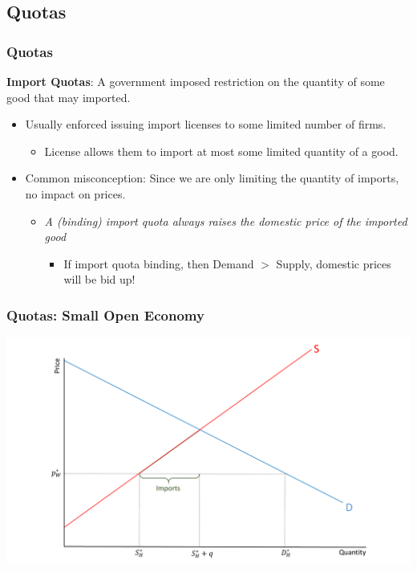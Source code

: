 \documentclass{beamer}
\begin{document}
\subsection{Quotas}
\begin{frame}
	\frametitle{Quotas}
	\textbf{Import Quotas}: A government imposed restriction on the quantity of some good that may imported. 
	\begin{itemize}
		\item Usually enforced issuing import licenses to some limited number of firms.	
		\begin{itemize}
			\item License allows them to import at most some limited quantity of a good. 
		\end{itemize}
		\item Common misconception: Since we are only limiting the quantity of imports, no impact on prices.
		\begin{itemize}
			\item \emph{A (binding) import quota always raises the domestic price of the imported good}
			\begin{itemize}
				\item If import quota binding, then Demand $>$ Supply, domestic prices will be bid up!
			\end{itemize}
		\end{itemize}
	\end{itemize}
	
	
\end{frame}


\begin{frame}
	\frametitle{Quotas: Small Open Economy}
	
	\includegraphics[scale=0.3]{SL_16.pdf}
	
\end{frame}
\end{document}

